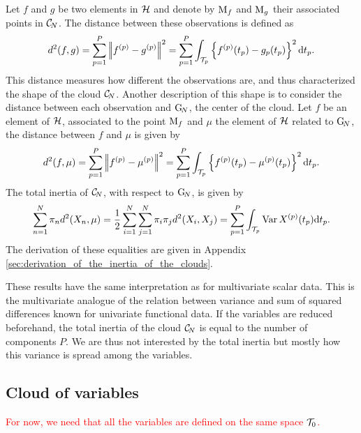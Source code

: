 Let $f$ and $g$ be two elements in $\mathcal{H}$ and denote by $\mathrm{M}_f$ and $\mathrm{M}_g$ their associated points in $\mathcal{C}_{\!N}$. The distance between these observations is defined as
\begin{equation}\label{eq:distance_obs}
    d^2(f, g) = \sum_{p = 1}^P \left|\!\left|f^{(p)} - g^{(p)}\right|\!\right|^2 = \sum_{p = 1}^P \int_{\mathcal{T}_{p}}\left\{f^{(p)}(t_p) - g_p(t_p)\right\}^2 {\rm d} t_p.
\end{equation}
This distance measures how different the observations are, and thus characterized the shape of the cloud $\mathcal{C}_{\!N}$. Another description of this shape is to consider the distance between each observation and $\mathrm{G}_{\!N}$, the center of the cloud. Let $f$ be an element of $\mathcal{H}$, associated to the point $\mathrm{M}_f$ and $\mu$ the element of $\mathcal{H}$ related to $\mathrm{G}_{\!N}$, the distance between $f$ and $\mu$ is given by
\begin{equation}\label{eq:distance_center}
    d^2(f, \mu) = \sum_{p = 1}^P \left|\!\left|f^{(p)} - \mu^{(p)}\right|\!\right|^2 = \sum_{p = 1}^P \int_{\mathcal{T}_{p}}\left\{f^{(p)}(t_p) - \mu^{(p)}(t_p)\right\}^2 {\rm d} t_p.
\end{equation}
The total inertia of $\mathcal{C}_{\!N}$, with respect to $\mathrm{G}_{\!N}$, is given by
\begin{equation}\label{eq:inertia}
    \sum_{n = 1}^N \pi_n d^2(X_n, \mu) = \frac{1}{2}\sum_{i = 1}^N \sum_{j = 1}^N \pi_i \pi_j d^2(X_i, X_j) = \sum_{p = 1}^P \int_{\mathcal{T}_{p}}\operatorname{Var}{X^{(p)}(t_p)} {\rm d} t_p.
\end{equation}
The derivation of these equalities are given in Appendix \ref{sec:derivation_of_the_inertia_of_the_clouds}.

\begin{remark}
    These results have the same interpretation as for multivariate scalar data. This is the multivariate analogue of the relation between variance and sum of squared differences known for univariate functional data. If the variables are reduced beforehand, the total inertia of the cloud $\mathcal{C}_{\!N}$ is equal to the number of components $P$. We are thus not interested by the total inertia but mostly how this variance is spread among the variables.
\end{remark}


\subsection{Cloud of variables} %
\label{sub:cloud_of_variables}

\textcolor{red}{For now, we need that all the variables are defined on the same space $\mathcal{T}_{0}$.}

